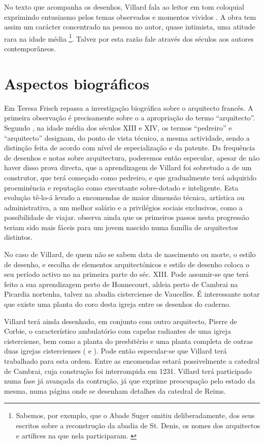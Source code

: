 \documentclass{article}
\begin{document}
No texto que acompanha os desenhos, Villard fala ao leitor em tom
coloquial exprimindo entusiasmo pelos temas observados e momentos
vividos . A obra tem assim um carácter concentrado na pessoa no autor,
quase intimista, uma atitude rara na idade média \footnote{Sabemos,
  por exemplo, que o Abade Suger omitiu deliberadamente, dos seus
  escritos sobre a reconstrução da abadia de St. Denis, os nomes dos
  arquitectos e artífices na que nela
  participaram. \cite{calado}}. Talvez por esta razão fale através dos
séculos aos autores contemporâneos.

\section{Aspectos biográficos}

Em \cite{teresa} Teresa Frisch repassa a investigação biográfica sobre
o arquitecto francês. A primeira observação é precisamente sobre o a
apropriação do termo ``arquitecto''. Segundo \cite{pevsner}, na idade
média dos séculos XIII e XIV, os termos ``pedreiro'' e ``arquitecto''
designam, do ponto de vista técnico, a mesma actividade, sendo a
distinção feita de acordo com nível de especialização e da patente. Da
frequência de desenhos e notas sobre arquitectura, poderemos então
especular, apesar de não haver disso prova directa, que a aprendizagem
de Villard foi sobretudo a de um construtor, que terá começado como
pedreiro, e que gradualmente terá adquirido proeminência e reputação
como executante sobre-dotado e inteligente. Esta evolução tê-lo-á
levado a encomendas de maior dimensão técnica, artística ou
administrativa, a um melhor salário e a privilégios sociais
exclusivos, como a possibilidade de viajar. \cite{teresa} observa
ainda que os primeiros passos nesta progressão teriam sido mais fáceis
para um jovem nascido numa família de arquitectos distintos.

No caso de Villard, de quem não se sabem data de nascimento ou morte,
o estilo de desenho, e escolha de elementos arquitectónicos e estilo
de desenho coloca o seu período activo no na primeira parte do
séc. XIII. Pode assumir-se que terá feito a sua aprendizagem perto de
Honnecourt, aldeia perto de Cambrai na Picardia nortenha, talvez na
abadia cisterciense de Vaucelles. É interessante notar que existe uma
planta do coro desta igreja entre os desenhos do caderno.

Villard terá ainda desenhado, em conjunto com outro arquitecto, Pierre
de Corbie, o característico ambulatório com capelas radiantes de uma
igreja cisterciense, bem como a planta do presbitério e uma planta
completa de outras duas igrejas cistercienses (\cite{teresa} e
\cite{hahnloser}). Pode então especular-se que Villard terá trabalhado
para esta ordem. Entre as encomendas estará possivelmente a catedral
de Cambrai, cuja construção foi interrompida em 1231. Villard terá
participado numa fase já avançada da contrução, já que exprime
preocupação pelo estado da mesma, numa página onde se desenham
detalhes da catedral de Reims.
\end{document}

